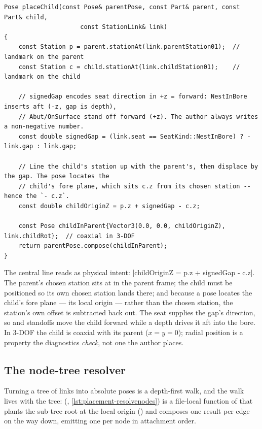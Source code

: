 \begin{listing}[htbp]
\begin{verbatim}
Pose placeChild(const Pose& parentPose, const Part& parent, const Part& child,
                     const StationLink& link)
{
    const Station p = parent.stationAt(link.parentStation01);  // landmark on the parent
    const Station c = child.stationAt(link.childStation01);    // landmark on the child

    // signedGap encodes seat direction in +z = forward: NestInBore inserts aft (-z, gap is depth),
    // Abut/OnSurface stand off forward (+z). The author always writes a non-negative number.
    const double signedGap = (link.seat == SeatKind::NestInBore) ? -link.gap : link.gap;

    // Line the child's station up with the parent's, then displace by the gap. The pose locates the
    // child's fore plane, which sits c.z from its chosen station -- hence the `- c.z`.
    const double childOriginZ = p.z + signedGap - c.z;

    const Pose childInParent{Vector3(0.0, 0.0, childOriginZ), link.childRot};  // coaxial in 3-DOF
    return parentPose.compose(childInParent);
}
\end{verbatim}
\caption{The complete per-edge placement math
().}\label{lst:placement-placechild}
\end{listing}

The central line reads as physical intent: \cppinline|childOriginZ = p.z + signedGap - c.z|. The
parent's chosen station sits at  in the parent frame; the child must be positioned so its
own chosen station lands there; and because a pose locates the child's fore plane --- its local
origin --- rather than the chosen station, the station's own offset  is subtracted back
out. The seat supplies the gap's direction, so  and  standoffs move the
child forward while a  depth drives it aft into the bore. In 3-DOF the child is
coaxial with its parent ($x = y = 0$); radial position is a property the diagnostics \emph{check},
not one the author places.

\subsection{The node-tree resolver}\label{sec:placement-resolver}

Turning a tree of links into absolute poses is a depth-first walk, and the walk lives with the tree:
 (, \cref{lst:placement-resolvenodes}) is a
file-local function of  that plants the sub-tree root at the local
origin () and composes one  result per edge on the way down,
emitting one  per node in attachment order.

